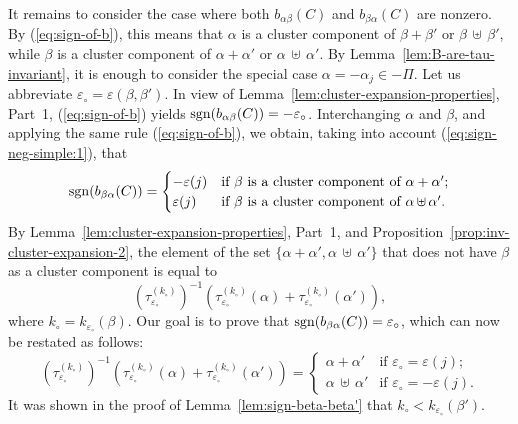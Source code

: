 \documentclass[letterpaper]{amsart}
\numberwithin{equation}{section}
\theoremstyle{definition}
\def\subplus{{\,\uplus\,} }
\begin{document}
It remains to consider the case where both $b_{\alpha\beta}(C)$ and 
$b_{\beta \alpha}(C)$ are nonzero. 
By (\ref{eq:sign-of-b}), this means that $\alpha$ is a cluster 
component of $\beta + \beta'$ or $\beta \subplus \beta'$, while 
$\beta$ is a cluster component of $\alpha + \alpha'$ or $\alpha \subplus \alpha'$. 
By Lemma~\ref{lem:B-are-tau-invariant}, 
it is enough to consider the special case $\alpha=-\alpha_j\in-\Pi$. 
Let us abbreviate $\varepsilon_\circ = \varepsilon(\beta, \beta')$. 
In view of Lemma~\ref{lem:cluster-expansion-properties}, Part~1, 
(\ref{eq:sign-of-b}) yields 
${\rm sgn}(b_{\alpha \beta}(C))= -\varepsilon_\circ$. 
Interchanging $\alpha$ and $\beta$, and applying the same rule 
(\ref{eq:sign-of-b}), we obtain, taking into account 
(\ref{eq:sign-neg-simple:1}), that 
\begin{equation*} 
{\rm sgn}(b_{\beta \alpha}(C))= 
\begin{cases} 
-\varepsilon(j) 
& \text{if $\beta$ is a cluster component of $\alpha + \alpha'$;}\\ 
\varepsilon(j) 
& \text{if $\beta$ is a cluster component of $\alpha \subplus \alpha'$.} 
\end{cases} 
\end{equation*} 
By Lemma~\ref{lem:cluster-expansion-properties}, Part~1, 
and Proposition~\ref{prop:inv-cluster-expansion-2}, 
the element of the set $\{\alpha + \alpha',\alpha \subplus \alpha'\}$ 
that does not have $\beta$ as a cluster component is equal to 
\[ 
(\tau^{(k_\circ)}_{\varepsilon_\circ})^{-1} 
(\tau^{(k_\circ)}_{\varepsilon_\circ} (\alpha) + 
\tau^{(k_\circ)}_{\varepsilon_\circ}(\alpha')) , 
\] 
where $k_\circ = k_{\varepsilon_\circ} (\beta)$. 
Our goal is to prove that ${\rm sgn}(b_{\beta 
  \alpha}(C))=\varepsilon_\circ$, 
which can now be restated as follows: 
\begin{equation} 
\label{eq:sum-or-subsum} 
(\tau^{(k_\circ)}_{\varepsilon_\circ})^{-1} 
(\tau^{(k_\circ)}_{\varepsilon_\circ} (\alpha) + 
\tau^{(k_\circ)}_{\varepsilon_\circ}(\alpha')) 
=\begin{cases} 
\alpha + \alpha' & \text{if $\varepsilon_\circ = \varepsilon(j)$;} \\[.05in] 
\alpha \subplus \alpha' & \text{if 
$\varepsilon_\circ = -\varepsilon(j)$.} 
\end{cases} 
\end{equation} 
It was shown in the proof of Lemma~\ref{lem:sign-beta-beta'} that 
$k_\circ \!<\! k_{\varepsilon_\circ} (\beta')$. 
\end{document}
